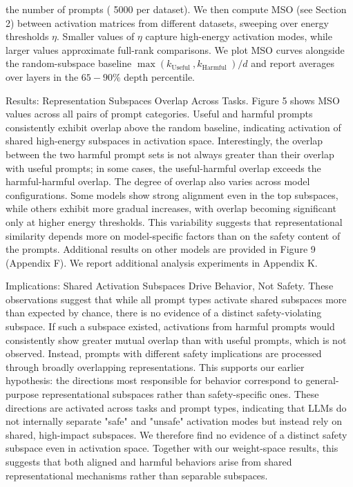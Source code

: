\documentclass[10pt]{article}
\begin{document}
the number of prompts ( 5000 per dataset). We then compute MSO (see Section 2) between activation matrices from different datasets, sweeping over energy thresholds $\eta$. Smaller values of $\eta$ capture high-energy activation modes, while larger values approximate full-rank comparisons. We plot MSO curves alongside the random-subspace baseline $\max \left(k_{\text {Useful }}, k_{\text {Harmful }}\right) / d$ and report averages over layers in the $65-90 \%$ depth percentile.

Results: Representation Subspaces Overlap Across Tasks. Figure 5 shows MSO values across all pairs of prompt categories. Useful and harmful prompts consistently exhibit overlap above the random baseline, indicating activation of shared high-energy subspaces in activation space. Interestingly, the overlap between the two harmful prompt sets is not always greater than their overlap with useful prompts; in some cases, the useful-harmful overlap exceeds the harmful-harmful overlap. The degree of overlap also varies across model configurations. Some models show strong alignment even in the top subspaces, while others exhibit more gradual increases, with overlap becoming significant only at higher energy thresholds. This variability suggests that representational similarity depends more on model-specific factors than on the safety content of the prompts. Additional results on other models are provided in Figure 9 (Appendix F). We report additional analysis experiments in Appendix K.

Implications: Shared Activation Subspaces Drive Behavior, Not Safety. These observations suggest that while all prompt types activate shared subspaces more than expected by chance, there is no evidence of a distinct safety-violating subspace. If such a subspace existed, activations from harmful prompts would consistently show greater mutual overlap than with useful prompts, which is not observed. Instead, prompts with different safety implications are processed through broadly overlapping representations. This supports our earlier hypothesis: the directions most responsible for behavior correspond to general-purpose representational subspaces rather than safety-specific ones. These directions are activated across tasks and prompt types, indicating that LLMs do not internally separate "safe" and "unsafe" activation modes but instead rely on shared, high-impact subspaces. We therefore find no evidence of a distinct safety subspace even in activation space. Together with our weight-space results, this suggests that both aligned and harmful behaviors arise from shared representational mechanisms rather than separable subspaces.
\end{document}
